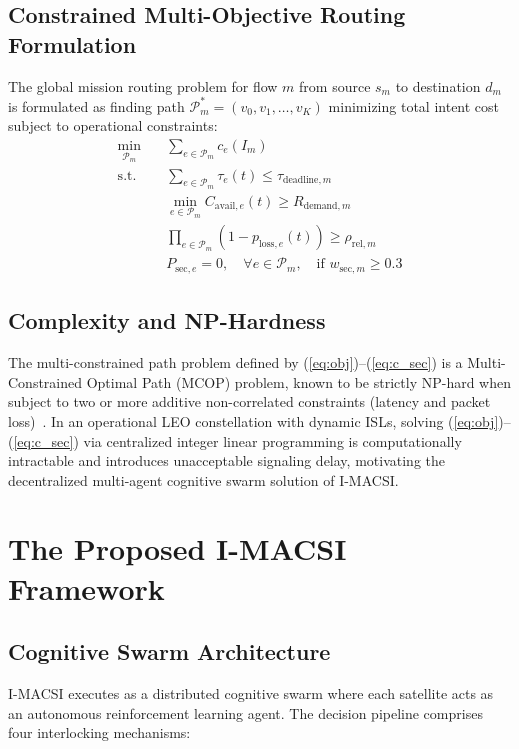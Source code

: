 \documentclass[journal]{IEEEtran}
\begin{document}
\subsection{Constrained Multi-Objective Routing Formulation}
The global mission routing problem for flow $m$ from source $s_m$ to destination $d_m$ is formulated as finding path $\mathcal{P}_m^* = (v_0, v_1, \dots, v_K)$ minimizing total intent cost subject to operational constraints:
\begin{align}
\min_{\mathcal{P}_m} \quad & \sum_{e \in \mathcal{P}_m} c_e(I_m) \label{eq:obj} \\
\text{s.t.} \quad & \sum_{e \in \mathcal{P}_m} \tau_e(t) \le \tau_{\text{deadline},m} \label{eq:c_lat} \\
& \min_{e \in \mathcal{P}_m} C_{\text{avail},e}(t) \ge R_{\text{demand},m} \label{eq:c_bw} \\
& \prod_{e \in \mathcal{P}_m} (1 - p_{\text{loss},e}(t)) \ge \rho_{\text{rel},m} \label{eq:c_rel} \\
& P_{\text{sec},e} = 0, \quad \forall e \in \mathcal{P}_m, \quad \text{if } w_{\text{sec},m} \ge 0.3 \label{eq:c_sec}
\end{align}

\subsection{Complexity and NP-Hardness}
The multi-constrained path problem defined by (\ref{eq:obj})--(\ref{eq:c_sec}) is a Multi-Constrained Optimal Path (MCOP) problem, known to be strictly NP-hard when subject to two or more additive non-correlated constraints (latency and packet loss)~\cite{wang1996quality}. In an operational LEO constellation with dynamic ISLs, solving (\ref{eq:obj})--(\ref{eq:c_sec}) via centralized integer linear programming is computationally intractable and introduces unacceptable signaling delay, motivating the decentralized multi-agent cognitive swarm solution of I-MACSI.

\section{The Proposed I-MACSI Framework}
\subsection{Cognitive Swarm Architecture}
I-MACSI executes as a distributed cognitive swarm where each satellite acts as an autonomous reinforcement learning agent. The decision pipeline comprises four interlocking mechanisms:
\end{document}
